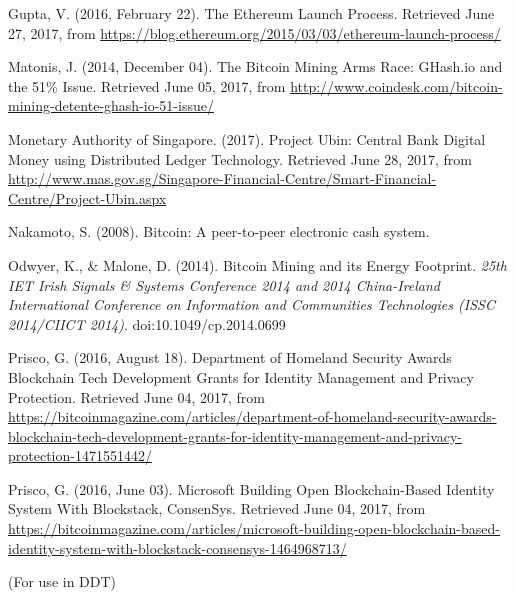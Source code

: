 \documentclass[a4paper,12pt]{article}
\begin{document}
{{\begin{thebibliography}{9}
Gupta, V. (2016, February 22). The Ethereum Launch Process. Retrieved June 27, 2017, from \href{https://blog.ethereum.org/2015/03/03/ethereum-launch-process/}{https://blog.ethereum.org/2015/03/03/ethereum-launch-process/}

Matonis, J. (2014, December 04). The Bitcoin Mining Arms Race: GHash.io and the 51\% Issue. Retrieved June 05, 2017, from \href{http://www.coindesk.com/bitcoin-mining-detente-ghash-io-51-issue/}{http://www.coindesk.com/bitcoin-mining-detente-ghash-io-51-issue/}

Monetary Authority of Singapore. (2017). Project Ubin: Central Bank Digital Money using Distributed Ledger Technology. Retrieved June 28, 2017, from \href{http://www.mas.gov.sg/Singapore-Financial-Centre/Smart-Financial-Centre/Project-Ubin.aspx}{http://www.mas.gov.sg/Singapore-Financial-Centre/Smart-Financial-Centre/Project-Ubin.aspx}

Nakamoto, S. (2008). Bitcoin: A peer-to-peer electronic cash system.

Odwyer, K., \& Malone, D. (2014). Bitcoin Mining and its Energy Footprint. \textit{25th IET Irish Signals \& Systems Conference 2014 and 2014 China-Ireland International Conference on Information and Communities Technologies (ISSC 2014/CIICT 2014)}. doi:10.1049/cp.2014.0699

Prisco, G. (2016, August 18). Department of Homeland Security Awards Blockchain Tech Development Grants for Identity Management and Privacy Protection. Retrieved June 04, 2017, from \href{https://bitcoinmagazine.com/articles/department-of-homeland-security-awards-blockchain-tech-development-grants-for-identity-management-and-privacy-protection-1471551442/}{https://bitcoinmagazine.com/articles/department-of-homeland-security-awards-blockchain-tech-development-grants-for-identity-management-and-privacy-protection-1471551442/}



Prisco, G. (2016, June 03). Microsoft Building Open Blockchain-Based Identity System With Blockstack, ConsenSys. Retrieved June 04, 2017, from \href{https://bitcoinmagazine.com/articles/microsoft-building-open-blockchain-based-identity-system-with-blockstack-consensys-1464968713/}{https://bitcoinmagazine.com/articles/microsoft-building-open-blockchain-based-identity-system-with-blockstack-consensys-1464968713/}
	
		(For use in DDT)
	

\end{thebibliography}}}
\end{document}
